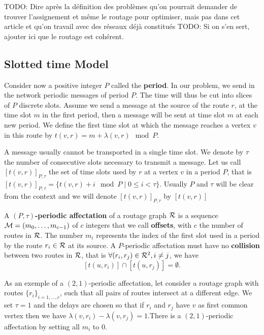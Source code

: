 \documentclass[a4paper,10pt]{article}
\newcommand{\todo}[1]{{\color{red} TODO: {#1}}}
\begin{document}
     \todo{Dire après  la définition des problèmes qu'on pourrait demander de trouver l'assignement et même le routage pour optimiser, mais pas dans cet article
     et qu'on travail avec des réseaux déjà constitués}
      \todo{Si on s'en sert, ajouter ici que le routage est cohérent.}

   \subsection{Slotted time Model}
      Consider now a positive integer $P$ called the {\bf period}. In our problem, we send in the network
      periodic messages of period $P$. The time will thus be cut into slices of $P$ discrete slots. Assume we send a message at the source of the route $r$, at the time slot $m$ in the first period, then a message will be sent at time slot $m$ at each new period. We define the first time slot at which the message reaches a vertex $v$ in this route by $t(v,r) = m + \lambda(v,r) \mod P$. 

      A message usually cannot be transported in a single time slot. We denote by $\tau$ the number 
      of consecutive slots necessary to transmit a message. Let us call $[t(v,r)]_{P,\tau}$ the set of time slots used by $r$ at a vertex $v$ in a period $P$, that is $[t(v,r)]_{P,\tau} = \{t(v,r) + i \mod P \mid 0 \leq i < \tau \}$. Usually $P$ and $\tau$ will be clear from the context and we will denote $[t(v,r)]_{P,\tau}$ by $[t(v,r)]$
      
      
      A {\bf $(P,\tau)$-periodic affectation} of a routage graph $\cal R$ is a sequence  ${\cal M}=(m_0, \ldots ,m_{c-1})$ of $c$ integers that we call {\bf offsets}, with $c$ the number of routes in $\cal R$. The number $m_i$ represents the index of the first slot used in a period  by the route $r_i \in {\cal R}$ at its source.
      A $P$-periodic affectation must have no {\bf collision} between two routes in ${\cal R}$, that is $\forall (r_i, r_j) \in {\cal R}^2, i \neq j$, %
      we have $$[t(u,r_i)] \cap [t(u,r_j)] = \emptyset .$$
      

      As an exemple of a $(2,1)$-periodic affectation, let consider a routage graph with routes $\{r_i\}_{i=1,\dots,c}$, such that all pairs of routes intersect at a different edge.
      We set $\tau = 1$ and the delays are chosen so that if $r_i$ and $r_j$ have $v$ as first common vertex then we have $\lambda(v,r_i) - \lambda(v,r_j)=1$.There is a $(2,1)$-periodic affectation by setting all $m_i$ to $0$.
\end{document}

